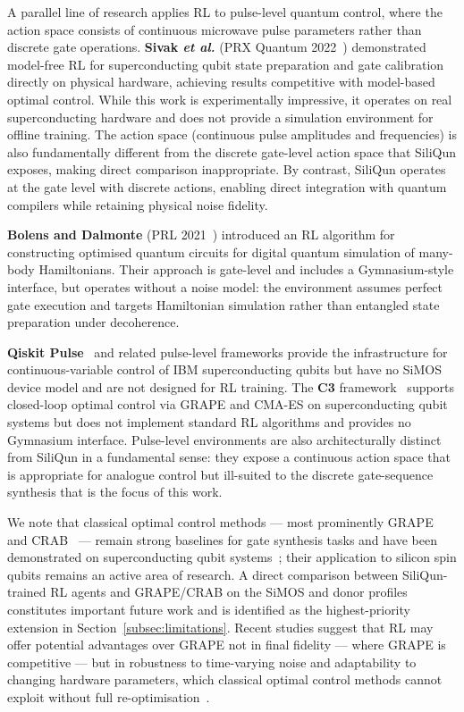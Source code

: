 A parallel line of research applies RL to pulse-level quantum control,
where the action space consists of continuous microwave pulse parameters
rather than discrete gate operations. \textbf{Sivak \emph{et al.}}
(PRX Quantum 2022~\cite{Sivak2022}) demonstrated model-free RL for
superconducting qubit state preparation and gate calibration directly on
physical hardware, achieving results competitive with model-based optimal
control. While this work is experimentally impressive, it operates on real
superconducting hardware and does not provide a simulation environment for
offline training. The action space (continuous pulse amplitudes and
frequencies) is also fundamentally different from the discrete gate-level
action space that SiliQun exposes, making direct comparison inappropriate.
By contrast, SiliQun operates at the gate level with discrete actions,
enabling direct integration with quantum compilers while retaining physical
noise fidelity.

\textbf{Bolens and Dalmonte} (PRL 2021~\cite{Bolens2021}) introduced an RL
algorithm for constructing optimised quantum circuits for digital quantum
simulation of many-body Hamiltonians. Their approach is gate-level and
includes a Gymnasium-style interface, but operates without a noise model:
the environment assumes perfect gate execution and targets Hamiltonian
simulation rather than entangled state preparation under decoherence.

\textbf{Qiskit Pulse}~\cite{Alexander2020} and related pulse-level
frameworks provide the infrastructure for continuous-variable control of IBM
superconducting qubits but have no SiMOS device model and are not designed
for RL training. The \textbf{C3} framework~\cite{Wittler2021} supports
closed-loop optimal control via GRAPE and CMA-ES on superconducting qubit
systems but does not implement standard RL algorithms and provides no
Gymnasium interface. Pulse-level
environments are also architecturally distinct from SiliQun in a
fundamental sense: they expose a continuous action space that is appropriate
for analogue control but ill-suited to the discrete gate-sequence synthesis
that is the focus of this work.

We note that classical optimal control methods --- most prominently
GRAPE~\cite{Khaneja2005} and CRAB~\cite{Caneva2011} --- remain strong
baselines for gate synthesis tasks and have been demonstrated on
superconducting qubit systems~\cite{Wittler2021,Sivak2022}; their application
to silicon spin qubits remains an active area of research. A direct comparison between
SiliQun-trained RL agents and GRAPE/CRAB on the SiMOS and donor profiles
constitutes important future work and is identified as the highest-priority
extension in Section~\ref{subsec:limitations}. Recent studies suggest that
RL may offer potential advantages over GRAPE not in final fidelity --- where
GRAPE is competitive --- but in robustness to time-varying noise and
adaptability to changing hardware parameters, which classical optimal control
methods cannot exploit without full re-optimisation~\cite{Sivak2022,Bolens2021}.

